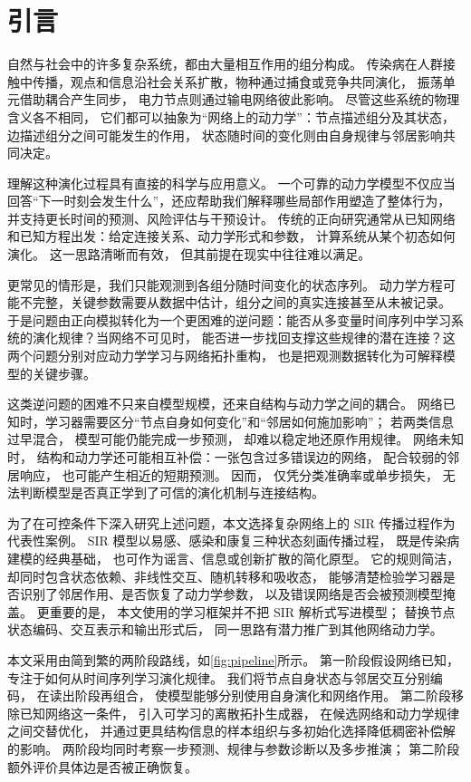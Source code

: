 \section{引言}

自然与社会中的许多复杂系统，都由大量相互作用的组分构成。
传染病在人群接触中传播，观点和信息沿社会关系扩散，物种通过捕食或竞争共同演化，
振荡单元借助耦合产生同步，
电力节点则通过输电网络彼此影响。
尽管这些系统的物理含义各不相同，
它们都可以抽象为“网络上的动力学”：节点描述组分及其状态，
边描述组分之间可能发生的作用，
状态随时间的变化则由自身规律与邻居影响共同决定\cite{strogatz2001,albert2002}。

理解这种演化过程具有直接的科学与应用意义。
一个可靠的动力学模型不仅应当回答“下一时刻会发生什么”，还应帮助我们解释哪些局部作用塑造了整体行为，
并支持更长时间的预测、风险评估与干预设计。
传统的正向研究通常从已知网络和已知方程出发：给定连接关系、动力学形式和参数，
计算系统从某个初态如何演化。
这一思路清晰而有效，
但其前提在现实中往往难以满足。

更常见的情形是，我们只能观测到各组分随时间变化的状态序列。
动力学方程可能不完整，关键参数需要从数据中估计，组分之间的真实连接甚至从未被记录。
于是问题由正向模拟转化为一个更困难的逆问题：能否从多变量时间序列中学习系统的演化规律？当网络不可见时，
能否进一步找回支撑这些规律的潜在连接？这两个问题分别对应动力学学习与网络拓扑重构，
也是把观测数据转化为可解释模型的关键步骤\cite{brunton2016,zhang2019ggn}。

这类逆问题的困难不只来自模型规模，还来自结构与动力学之间的耦合。
网络已知时，学习器需要区分“节点自身如何变化”和“邻居如何施加影响”；
若两类信息过早混合，
模型可能仍能完成一步预测，
却难以稳定地还原作用规律。
网络未知时，
结构和动力学还可能相互补偿：一张包含过多错误边的网络，
配合较弱的邻居响应，
也可能产生相近的短期预测。
因而，
仅凭分类准确率或单步损失，
无法判断模型是否真正学到了可信的演化机制与连接结构。

为了在可控条件下深入研究上述问题，本文选择复杂网络上的 SIR 传播过程作为代表性案例。
SIR 模型以易感、感染和康复三种状态刻画传播过程，
既是传染病建模的经典基础，
也可作为谣言、信息或创新扩散的简化原型\cite{kermack1927,pastorsatorras2015}。
它的规则简洁，
却同时包含状态依赖、非线性交互、随机转移和吸收态，
能够清楚检验学习器是否识别了邻居作用、是否恢复了动力学参数，
以及错误网络是否会被预测模型掩盖。
更重要的是，
本文使用的学习框架并不把 SIR 解析式写进模型；
替换节点状态编码、交互表示和输出形式后，
同一思路有潜力推广到其他网络动力学。

本文采用由简到繁的两阶段路线，如\cref{fig:pipeline}所示。
第一阶段假设网络已知，专注于如何从时间序列学习演化规律。
我们将节点自身状态与邻居交互分别编码，
在读出阶段再组合，
使模型能够分别使用自身演化和网络作用。
第二阶段移除已知网络这一条件，
引入可学习的离散拓扑生成器，
在候选网络和动力学规律之间交替优化，
并通过更具结构信息的样本组织与多初始化选择降低稠密补偿解的影响。
两阶段均同时考察一步预测、规律与参数诊断以及多步推演；
第二阶段额外评价具体边是否被正确恢复。


